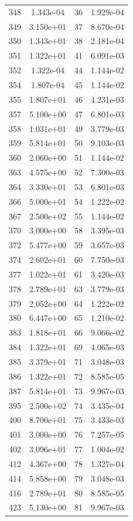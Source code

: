 \documentclass[12pt]{article}
\begin{document}
\begin{longtable}{@{}cccc@{}}
348 & 1.343e-04 & 36 & 1.929e-04 \\
349 & 3.150e+01 & 37 & 8.670e-04 \\
350 & 1.343e+01 & 38 & 2.181e-04 \\
351 & 1.322e+01 & 41 & 6.091e-03 \\
352 & 1.322e-04 & 44 & 1.144e-02 \\
354 & 1.807e-04 & 45 & 1.144e-02 \\
355 & 1.807e+01 & 46 & 4.231e-03 \\
357 & 5.100e+00 & 47 & 6.801e-03 \\
358 & 1.031e+01 & 49 & 3.779e-03 \\
359 & 5.814e+01 & 50 & 9.103e-03 \\
360 & 2.060e+00 & 51 & 1.144e-02 \\
363 & 4.575e+00 & 52 & 7.300e-03 \\
364 & 3.330e+01 & 53 & 6.801e-03 \\
366 & 5.000e+01 & 54 & 1.222e-02 \\
367 & 2.500e+02 & 55 & 1.144e-02 \\
370 & 3.000e+00 & 58 & 3.395e-03 \\
372 & 5.477e+00 & 59 & 3.657e-03 \\
374 & 2.602e+01 & 60 & 7.750e-03 \\
377 & 1.022e+01 & 61 & 3.420e-03 \\
378 & 2.789e+01 & 63 & 3.779e-03 \\
379 & 2.052e+00 & 64 & 1.222e-02 \\
380 & 6.447e+00 & 65 & 1.210e-02 \\
383 & 1.818e+01 & 66 & 9.066e-02 \\
384 & 1.322e+01 & 69 & 4.065e-03 \\
385 & 3.379e+01 & 71 & 3.048e-03 \\
386 & 1.322e+01 & 72 & 8.585e-05 \\
387 & 5.814e+01 & 73 & 9.967e-03 \\
395 & 2.500e+02 & 74 & 3.435e-04 \\
400 & 8.700e+01 & 75 & 3.433e-03 \\
401 & 3.000e+00 & 76 & 7.257e-05 \\
402 & 3.096e+01 & 77 & 1.004e-02 \\
412 & 4.367e+00 & 78 & 1.327e-04 \\
414 & 5.858e+00 & 79 & 3.048e-03 \\
416 & 2.789e+01 & 80 & 8.585e-05 \\
423 & 5.130e+00 & 81 & 9.967e-03 \\

\end{longtable}
\end{document}

